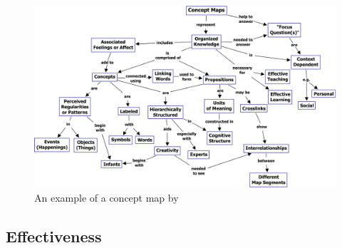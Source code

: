 \begin{figure}
    \centering
    \includegraphics[width=\textwidth]{img/conceptmap.png}
    \caption{An example of a concept map by \protect{}}
    \label{fig:conceptmap}
\end{figure}

\subsection{Effectiveness}

